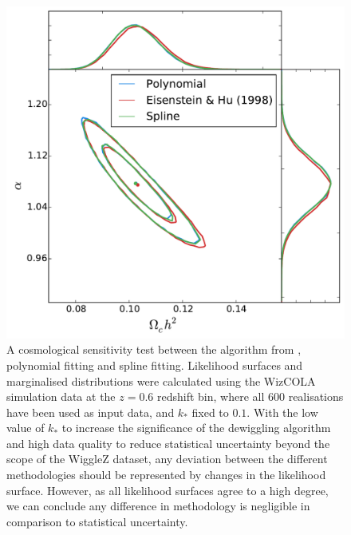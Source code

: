 \documentclass[a4paper,fleqn,usenatbib]{mnras}
\begin{document}
	
	\begin{figure}
		\begin{center}
			\includegraphics[width=\columnwidth]{AcosmologyTest.pdf}
		\end{center}
		\caption{A cosmological sensitivity test between the algorithm from \citet{EisensteinHu1998}, polynomial fitting and spline fitting. Likelihood surfaces and marginalised distributions were calculated using the WizCOLA simulation data at the $z=0.6$ redshift bin, where all 600 realisations have been used as input data, and $k_*$ fixed to $0.1$. With the low value of $k_*$ to increase the significance of the dewiggling algorithm and high data quality to reduce statistical uncertainty beyond the scope of the WiggleZ dataset, any deviation between the different methodologies should be represented by changes in the likelihood surface. However, as all likelihood surfaces agree to a high degree, we can conclude any difference in methodology is negligible in comparison to statistical uncertainty.}
		\label{fig:AcosmologyTest}
	\end{figure}
	
	
	
\end{document}
